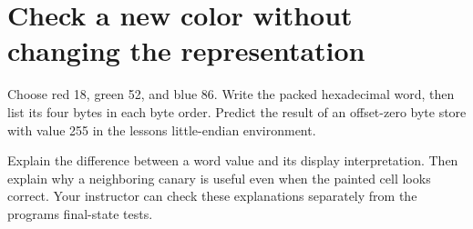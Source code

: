 \section{Check a new color without changing the
  representation}\label{002-single-pixel-x-practice-check-a-new-color-without-changing-the-representation}

Choose red 18, green 52, and blue 86. Write the packed hexadecimal word,
then list its four bytes in each byte order. Predict the result of an
offset-zero byte store with value 255 in the lesson\textquotesingle s
little-endian environment.

Explain the difference between a word value and its display
interpretation. Then explain why a neighboring canary is useful even
when the painted cell looks correct. Your instructor can check these
explanations separately from the program\textquotesingle s final-state
tests.
